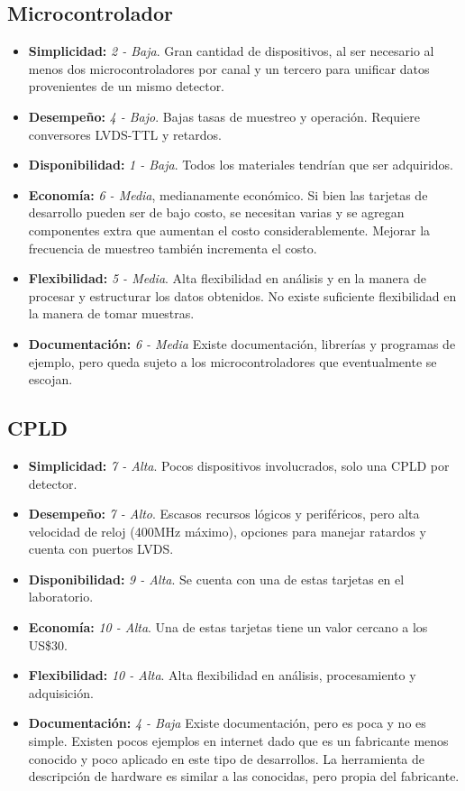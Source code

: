 \subsection{Microcontrolador}
\begin{itemize}
    \item \textbf{Simplicidad: } \textit{2 - Baja}. Gran cantidad de dispositivos, al ser necesario al menos dos microcontroladores por canal y un tercero para unificar datos provenientes de un mismo detector.
    \item \textbf{Desempeño: } \textit{4 - Bajo}. Bajas tasas de muestreo y operación. Requiere conversores LVDS-TTL y retardos.
    \item \textbf{Disponibilidad: } \textit{1 - Baja}. Todos los materiales tendrían que ser adquiridos.
    \item \textbf{Economía: } \textit{6 - Media}, medianamente económico. Si bien las tarjetas de desarrollo pueden ser de bajo costo, se necesitan varias y se agregan componentes extra que aumentan el costo considerablemente. Mejorar la frecuencia de muestreo también incrementa el costo.
    \item \textbf{Flexibilidad:} \textit{5 - Media}. Alta flexibilidad en análisis y en la manera de procesar y estructurar los datos obtenidos. No existe suficiente flexibilidad en la manera de tomar muestras.
    \item \textbf{Documentación:} \textit{6 - Media} Existe documentación, librerías y programas de ejemplo, pero queda sujeto a los microcontroladores que eventualmente se escojan.
\end{itemize}

\newpage
\subsection{CPLD}
\begin{itemize}
    \item \textbf{Simplicidad:} \textit{7 - Alta}. Pocos dispositivos involucrados, solo una CPLD por detector.
    \item \textbf{Desempeño:}  \textit{7 - Alto}. Escasos recursos lógicos y periféricos, pero alta velocidad de reloj (400MHz máximo), opciones para manejar ratardos y cuenta con puertos LVDS.
    \item \textbf{Disponibilidad:} \textit{9 - Alta}. Se cuenta con una de estas tarjetas en el laboratorio.
    \item \textbf{Economía: } \textit{10 - Alta}. Una de estas tarjetas tiene un valor cercano a los US\$30.
    \item \textbf{Flexibilidad:} \textit{10 - Alta}. Alta flexibilidad en análisis, procesamiento y adquisición.
    \item \textbf{Documentación:} \textit{4 - Baja} Existe documentación, pero es poca y no es simple. Existen pocos ejemplos en internet dado que es un fabricante menos conocido y poco aplicado en este tipo de desarrollos. La herramienta de descripción de hardware es similar a las conocidas, pero propia del fabricante.
\end{itemize}


